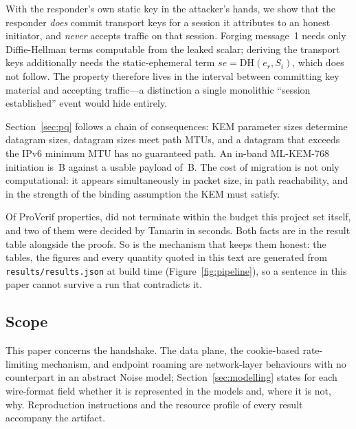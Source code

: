  With the responder's
own static key in the attacker's hands, we show that the responder \emph{does}
commit transport keys for a session it attributes to an honest initiator, and
\emph{never} accepts traffic on that session. Forging message~1 needs only
Diffie-Hellman terms computable from the leaked scalar; deriving the transport
keys additionally needs the static-ephemeral term \(se=\mathrm{DH}(e_r,S_i)\),
which does not follow. The property therefore lives in the interval between
committing key material and accepting traffic---a distinction a single
monolithic ``session established'' event would hide entirely.

Section~\ref{sec:pq} follows a chain of consequences: KEM parameter sizes
determine datagram sizes, datagram sizes meet path MTUs, and a datagram that
exceeds the IPv6 minimum MTU has no guaranteed path. An in-band ML-KEM-768
initiation is \wgKemInit\,B against a usable payload of \wgIpvsixPayload\,B.
The cost of migration is not only computational: it appears simultaneously in
packet size, in path reachability, and in the strength of the binding
assumption the KEM must satisfy.

 Of \wgPvProps{}
ProVerif properties, \wgPvNonterm{} did not terminate within the budget this
project set itself, and two of them were decided by Tamarin in seconds. Both facts are in the result
table alongside the proofs. So is the mechanism that keeps them honest: the
tables, the figures and every quantity quoted in this text are generated from
\texttt{results/results.json} at build time (Figure~\ref{fig:pipeline}), so a
sentence in this paper cannot survive a run that contradicts it.

\subsection{Scope}

This paper concerns the handshake. The data plane, the cookie-based
rate-limiting mechanism, and endpoint roaming are network-layer behaviours
with no counterpart in an abstract Noise model;
Section~\ref{sec:modelling} states for each wire-format field whether it is
represented in the models and, where it is not, why. Reproduction
instructions and the resource profile of every result accompany the artifact.
